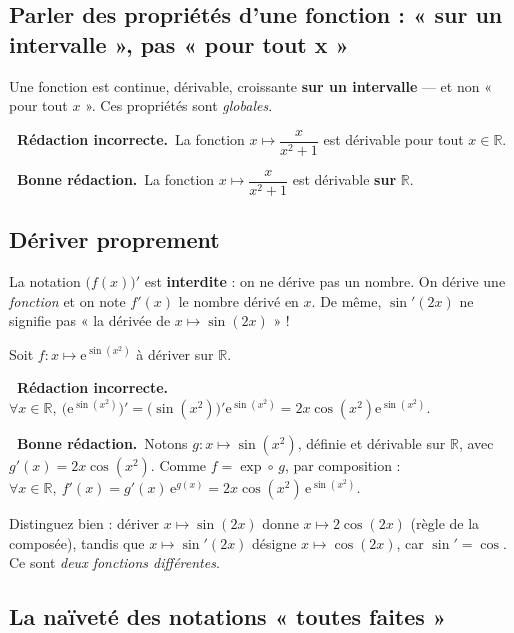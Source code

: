 \documentclass[11pt,a4paper]{article}
\newcommand{\ok}{\textcolor{METeal}{\textbf{\ding{51}\ \sffamily Bonne rédaction.}}\ }
\newcommand{\ko}{\textcolor{MECoral}{\textbf{\ding{55}\ \sffamily Rédaction incorrecte.}}\ }
\newcommand{\R}{\mathbb{R}}
\begin{document}
\subsection{Parler des propriétés d'une fonction : « sur un intervalle », pas « pour tout x »}

\begin{attention}
Une fonction est continue, dérivable, croissante \textbf{sur un intervalle} — et non
« pour tout $x$ ». Ces propriétés sont \emph{globales}.
\end{attention}
\begin{mauvaise}
\ko La fonction $x\mapsto \dfrac{x}{x^2+1}$ est dérivable pour tout $x\in\R$.
\end{mauvaise}
\begin{bonne}
\ok La fonction $x\mapsto \dfrac{x}{x^2+1}$ est dérivable \textbf{sur} $\R$.
\end{bonne}

\subsection{Dériver proprement}

\begin{attention}
La notation $\big(f(x)\big)'$ est \textbf{interdite} : on ne dérive pas un nombre. On dérive
une \emph{fonction} et on note $f'(x)$ le nombre dérivé en $x$. De même, $\sin'(2x)$ ne
signifie pas « la dérivée de $x\mapsto\sin(2x)$ » !
\end{attention}
Soit $f:x\mapsto \mathrm e^{\sin(x^2)}$ à dériver sur $\R$.
\begin{mauvaise}
\ko $\forall x\in\R,\ \big(\mathrm e^{\sin(x^2)}\big)'=\big(\sin(x^2)\big)'\mathrm e^{\sin(x^2)}
=2x\cos(x^2)\mathrm e^{\sin(x^2)}.$
\end{mauvaise}
\begin{bonne}
\ok Notons $g:x\mapsto \sin(x^2)$, définie et dérivable sur $\R$, avec
$g'(x)=2x\cos(x^2)$. Comme $f=\exp\circ\,g$, par composition :
$\forall x\in\R,\ f'(x)=g'(x)\,\mathrm e^{g(x)}=2x\cos(x^2)\,\mathrm e^{\sin(x^2)}.$
\end{bonne}
\begin{remarque}
Distinguez bien : dériver $x\mapsto\sin(2x)$ donne $x\mapsto 2\cos(2x)$ (règle de la
composée), tandis que $x\mapsto\sin'(2x)$ désigne $x\mapsto\cos(2x)$, car $\sin'=\cos$. Ce
sont \emph{deux fonctions différentes}.
\end{remarque}

\subsection{La naïveté des notations « toutes faites »}
\end{document}
